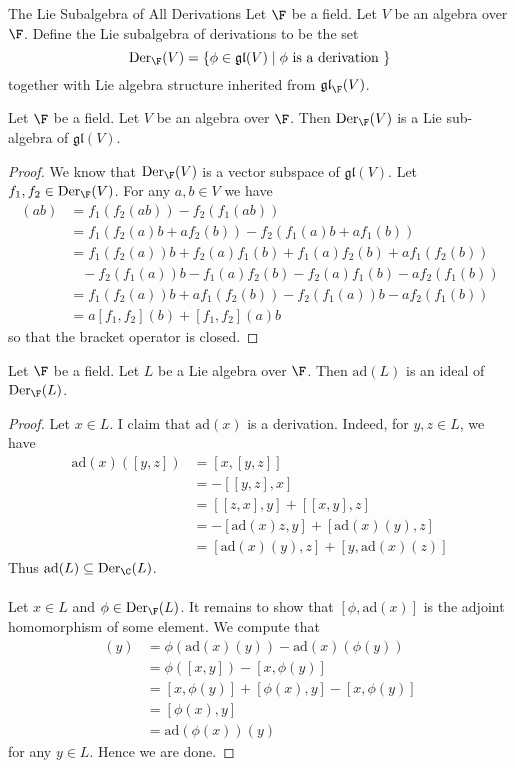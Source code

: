 \documentclass[a4paper]{article}
\begin{document}
\begin{defn}{The Lie Subalgebra of All Derivations}{} Let $\F$ be a field. Let $V$ be an algebra over $\F$. Define the Lie subalgebra of derivations to be the set $$\text{Der}_\F(V)=\{\phi\in\mathfrak{gl}(V)\;|\;\phi\text{ is a derivation }\}$$ together with Lie algebra structure inherited from $\mathfrak{gl}_\F(V)$. 
\end{defn}

\begin{lmm}{}{} Let $\F$ be a field. Let $V$ be an algebra over $\F$. Then $\text{Der}_\F(V)$ is a Lie sub-algebra of $\mathfrak{gl}(V)$. \tcbline
\begin{proof}
We know that $\text{Der}_\F(V)$ is a vector subspace of $\mathfrak{gl}(V)$. Let $f_1,f_2\in\text{Der}_\F(V)$. For any $a,b\in V$ we have 
\begin{align*}
[f_1,f_2](ab)&=f_1(f_2(ab))-f_2(f_1(ab))\\
&=f_1(f_2(a)b+af_2(b))-f_2(f_1(a)b+af_1(b))\\
&=f_1(f_2(a))b+f_2(a)f_1(b)+f_1(a)f_2(b)+af_1(f_2(b))\\
&\;\;\;-f_2(f_1(a))b-f_1(a)f_2(b)-f_2(a)f_1(b)-af_2(f_1(b))\\
&=f_1(f_2(a))b+af_1(f_2(b))-f_2(f_1(a))b-af_2(f_1(b))\\
&=a[f_1,f_2](b)+[f_1,f_2](a)b
\end{align*}
so that the bracket operator is closed. 
\end{proof}
\end{lmm}

\begin{lmm}{}{} Let $\F$ be a field. Let $L$ be a Lie algebra over $\F$. Then $\text{ad}(L)$ is an ideal of $\text{Der}_\F(L)$. \tcbline
\begin{proof}
Let $x\in L$. I claim that $\text{ad}(x)$ is a derivation. Indeed, for $y,z\in L$, we have 
\begin{align*}
\text{ad}(x)([y,z])&=[x,[y,z]]\\
&=-[[y,z],x]\\
&=[[z,x],y]+[[x,y],z]\\
&=-[\text{ad}(x)z,y]+[\text{ad}(x)(y),z]\\
&=[\text{ad}(x)(y),z]+[y,\text{ad}(x)(z)]
\end{align*}
Thus $\text{ad}(L)\subseteq\text{Der}_\C(L)$. \\~\\

Let $x\in L$ and $\phi\in\text{Der}_\F(L)$. It remains to show that $[\phi,\text{ad}(x)]$ is the adjoint homomorphism of some element. We compute that 
\begin{align*}
[\phi,\text{ad}(x)](y)&=\phi(\text{ad}(x)(y))-\text{ad}(x)(\phi(y))\\
&=\phi([x,y])-[x,\phi(y)]\\
&=[x,\phi(y)]+[\phi(x),y]-[x,\phi(y)]\\
&=[\phi(x),y]\\
&=\text{ad}(\phi(x))(y)
\end{align*}
for any $y\in L$. Hence we are done. 
\end{proof}
\end{lmm}
\end{document}
